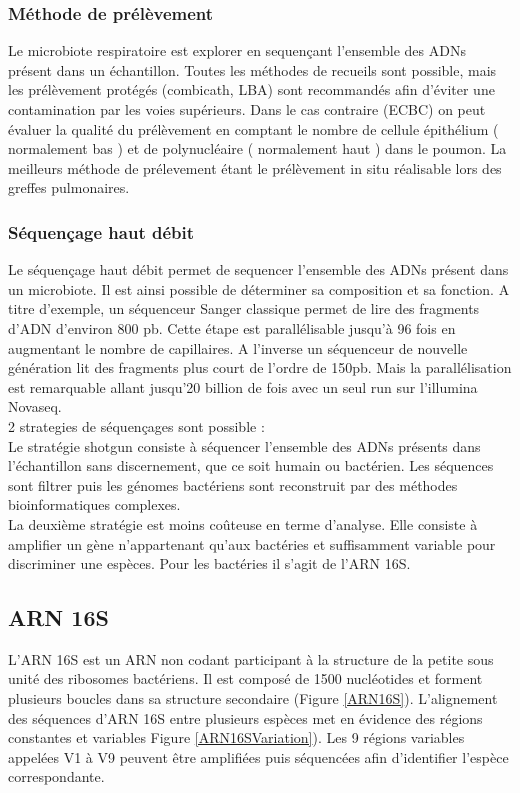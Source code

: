 \documentclass[12pt,a4paper]{article}
\begin{document}
\subsubsection{Méthode de prélèvement}
Le microbiote respiratoire est explorer en sequençant l'ensemble des ADNs présent dans un échantillon. 
Toutes les méthodes de recueils sont possible, mais les prélèvement protégés (combicath, LBA) sont recommandés afin d’éviter une contamination par les voies supérieurs. Dans le cas contraire (ECBC) on peut évaluer la qualité du prélèvement en comptant le nombre de cellule épithélium ( normalement bas ) et de polynucléaire ( normalement haut ) dans le poumon. La meilleurs méthode de prélevement étant le prélèvement in situ réalisable lors des greffes pulmonaires.

\subsubsection{Séquençage haut débit}
Le séquençage haut débit permet de sequencer l'ensemble des ADNs présent dans un microbiote. Il est ainsi possible de déterminer sa composition et sa fonction. A titre d'exemple, un séquenceur Sanger classique permet de lire des fragments d'ADN d'environ 800 pb. Cette étape est parallélisable jusqu'à 96 fois en augmentant le nombre de capillaires.
A l'inverse un séquenceur de nouvelle génération lit des fragments plus court de l'ordre de 150pb. Mais la parallélisation est remarquable allant jusqu'20 billion de fois avec un seul run sur l'illumina Novaseq. \\
2 strategies de séquençages sont possible :  \\
Le stratégie shotgun consiste à séquencer l'ensemble des ADNs présents dans l'échantillon sans discernement, que ce soit humain ou bactérien. Les séquences sont filtrer puis les génomes bactériens sont reconstruit par des méthodes bioinformatiques complexes. \\
La deuxième stratégie est moins coûteuse en terme d'analyse. Elle consiste à amplifier un gène n'appartenant qu'aux bactéries et suffisamment variable pour discriminer une espèces. Pour les bactéries il s'agit de l'ARN 16S.\\

\subsection{ARN 16S}

L'ARN 16S est un ARN non codant participant à la structure de la petite sous unité des ribosomes bactériens. Il est composé de 1500 nucléotides et forment plusieurs boucles dans sa structure secondaire (Figure \ref{ARN16S}). 
L'alignement des séquences d'ARN 16S entre plusieurs espèces met en évidence des régions constantes et variables Figure \ref{ARN16SVariation}). Les 9 régions variables appelées V1 à V9 peuvent être amplifiées puis séquencées afin d'identifier l'espèce correspondante.
\end{document}
